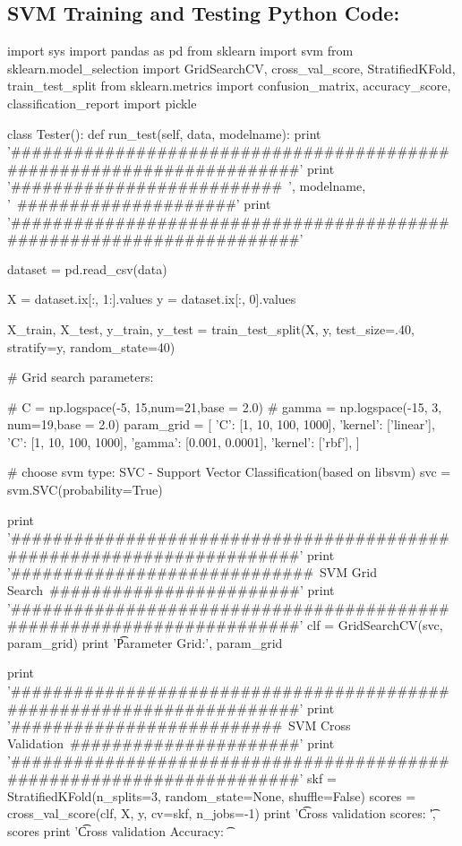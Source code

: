 \subsection*{SVM Training and Testing Python Code:}
        \begin{pythoncode}
    
  
import sys
import pandas as pd
from sklearn import svm
from sklearn.model_selection import GridSearchCV, cross_val_score, StratifiedKFold, train_test_split
from sklearn.metrics import confusion_matrix, accuracy_score, classification_report
import pickle


class Tester():
    def run_test(self, data, modelname):
        print '\n######################################################################'
        print '##########################~', modelname, '~#####################'
        print '######################################################################'

        dataset = pd.read_csv(data)

        X = dataset.ix[:, 1:].values
        y = dataset.ix[:, 0].values

        X_train, X_test, y_train, y_test = train_test_split(X, y, 
        test_size=.40, stratify=y, random_state=40)

        # Grid search parameters:
		
        # C = np.logspace(-5, 15,num=21,base = 2.0)
        # gamma = np.logspace(-15, 3, num=19,base = 2.0)
        param_grid = [
            {'C': [1, 10, 100, 1000], 'kernel': ['linear']},
            {'C': [1, 10, 100, 1000], 'gamma': [0.001, 0.0001], 'kernel': ['rbf']},
        ]
		
		# choose svm type: SVC - Support Vector Classification(based on libsvm)
        svc = svm.SVC(probability=True)

        print '\n######################################################################'
        print '#############################~SVM Grid Search~########################'
        print '######################################################################'
        clf = GridSearchCV(svc, param_grid)
        print '\t Parameter Grid:\n', param_grid

        print '\n######################################################################'
        print '##########################~SVM Cross Validation~######################'
        print '######################################################################'
        skf = StratifiedKFold(n_splits=3, random_state=None, shuffle=False)
        scores = cross_val_score(clf, X, y, cv=skf, n_jobs=-1)
        print '\t Cross validation scores: \t', scores
        print '\t Cross validation Accuracy:
        		\t %


\end{pythoncode}
